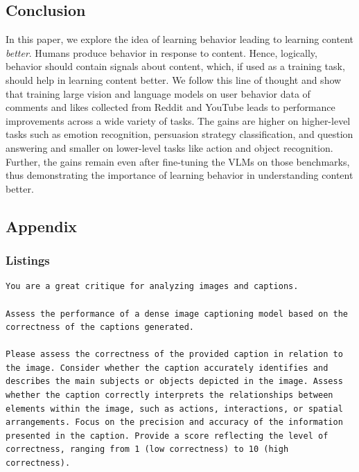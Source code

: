 \subsection{Conclusion}
In this paper, we explore the idea of learning behavior leading to learning content \textit{better}. Humans produce behavior in response to content. Hence, logically, behavior should contain signals about content, which, if used as a training task, should help in learning content better. We follow this line of thought and show that training large vision and language models on user behavior data of comments and likes collected from Reddit and YouTube leads to performance improvements across a wide variety of tasks. The gains are higher on higher-level tasks such as emotion recognition, persuasion strategy classification, and question answering and smaller on lower-level tasks like action and object recognition. Further, the gains remain even after fine-tuning the VLMs on those benchmarks, thus demonstrating the importance of learning behavior in understanding content better.












%
%















\subsection{Appendix}

\subsubsection{Listings}

\begin{lstlisting}[caption={GPT-4V Prompt to calculate correctness of a image dense caption},frame=single,breaklines=true,basicstyle=\scriptsize, label={lst:dense-caption-correctness}]
You are a great critique for analyzing images and captions.

Assess the performance of a dense image captioning model based on the correctness of the captions generated.

Please assess the correctness of the provided caption in relation to the image. Consider whether the caption accurately identifies and describes the main subjects or objects depicted in the image. Assess whether the caption correctly interprets the relationships between elements within the image, such as actions, interactions, or spatial arrangements. Focus on the precision and accuracy of the information presented in the caption. Provide a score reflecting the level of correctness, ranging from 1 (low correctness) to 10 (high correctness).
\end{lstlisting}


